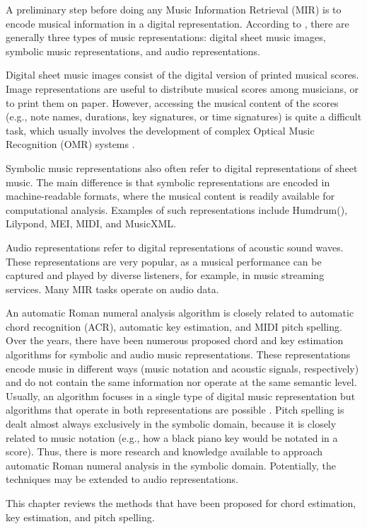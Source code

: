 
A preliminary step before doing any Music Information
Retrieval (MIR) is to encode musical information in a
digital representation. According to
\textcite{muller2015music}, there are generally three types
of music representations: digital sheet music images,
symbolic music representations, and audio representations.

Digital sheet music images consist of the digital version of
printed musical scores. Image representations are useful to
distribute musical scores among musicians, or to print them
on paper. However, accessing the musical content of the
scores (e.g., note names, durations, key signatures, or time
signatures) is quite a difficult task, which usually
involves the development of complex Optical Music
Recognition (OMR) systems
\parencite{calvozaragoza2020understanding}.

Symbolic music representations also often refer to digital
representations of sheet music. The main difference is that
symbolic representations are encoded in machine-readable
formats, where the musical content is readily available for
computational analysis. Examples of such representations
include Humdrum(), Lilypond, MEI, MIDI, and
MusicXML.

Audio representations refer to digital representations of
acoustic sound waves. These representations are very
popular, as a musical performance can be captured and played
by diverse listeners, for example, in music streaming
services. Many MIR tasks operate on audio data.

An automatic Roman numeral analysis algorithm is closely
related to automatic chord recognition (ACR), automatic key
estimation, and MIDI pitch spelling. Over the years, there
have been numerous proposed chord and key estimation
algorithms for symbolic and audio music representations.
These representations encode music in different ways (music
notation and acoustic signals, respectively) and do not
contain the same information nor operate at the same
semantic level. Usually, an algorithm focuses in a single
type of digital music representation but algorithms that
operate in both representations are possible
\parencite{napoleslopez2019keyfinding}. Pitch spelling is
dealt almost always exclusively in the symbolic domain,
because it is closely related to music notation (e.g., how a
black piano key would be notated in a score). Thus, there is
more research and knowledge available to approach automatic
Roman numeral analysis in the symbolic domain. Potentially,
the techniques may be extended to audio representations.

This chapter reviews the methods that have been proposed for chord estimation, key estimation, and pitch spelling.
